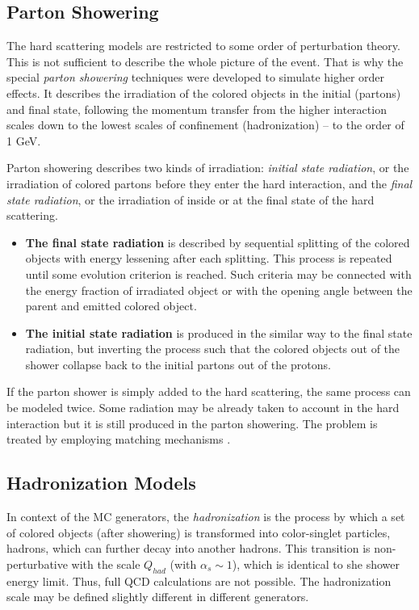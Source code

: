 \subsection{Parton Showering}

The hard scattering models are restricted to some order of perturbation theory. This is not sufficient to describe the 
whole picture of the event. That is why the special \textit{parton showering} techniques were developed to simulate 
higher order effects. It describes the irradiation of the colored objects in the initial (partons) and final state,
following the momentum transfer from the higher interaction scales down to the lowest scales of confinement (hadronization) --
to the order of 1 GeV.

Parton showering describes two kinds of irradiation: \textit{initial state radiation}, or the irradiation of colored partons
before they enter the hard interaction, and the \textit{final state radiation}, or the irradiation of inside or at the final
state of the hard scattering.

\begin{itemize}
 \item \textbf{The final state radiation} is described by sequential splitting of the colored objects with energy lessening
 after each splitting. This process is repeated until some evolution criterion is reached. Such criteria may be connected
 with the energy fraction of irradiated object or with the opening angle between the parent and emitted colored object.
 
 \item \textbf{The initial state radiation} is produced in the similar way to the final state radiation, but inverting
 the process such that the colored objects out of the shower collapse back to the initial partons out of the protons.
\end{itemize}

If the parton shower is simply added to the hard scattering, the same process can be modeled twice. Some radiation
may be already taken to account in the hard interaction but it is still produced in the parton showering. The problem 
is treated by employing matching mechanisms \cite{Buckley:2011ms}.

\subsection{Hadronization Models}

In context of the MC generators, the \textit{hadronization} is the process by which a set of colored objects (after showering)
is transformed into color-singlet particles, hadrons, which can further decay into another hadrons. This transition is non-perturbative
with the scale $Q_{had}$ (with $\alpha_{s} \sim 1$), which is identical to she shower energy limit. Thus, full QCD calculations
are not possible. The hadronization scale may be defined slightly different in different generators.
% 

